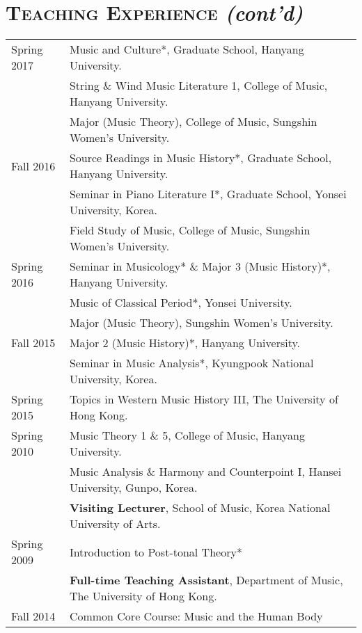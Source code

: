 \documentclass[a4paper,11pt]{article}
\begin{document}
  \section*{\textsc{Teaching Experience} \textit{(cont'd)}}
  
  \hspace*{-0.25cm}
  \begin{tabular}{p{2.5cm} l}
    Spring 2017 & Music and Culture*, Graduate School, Hanyang University.\\
    & String \& Wind Music Literature 1, College of Music, Hanyang University.\\
    & Major (Music Theory), College of Music, Sungshin Women's University.\\
    
    Fall 2016 & Source Readings in Music History*, Graduate School, Hanyang University.\\
    & Seminar in Piano Literature I*, Graduate School, Yonsei University, Korea.\\
    & Field Study of Music, College of Music, Sungshin Women's University.\\
    
    Spring 2016 & Seminar in Musicology* \& Major 3 (Music History)*, Hanyang University.\\
    & Music of Classical Period*, Yonsei University.\\
    & Major (Music Theory), Sungshin Women's University.\\
    
    Fall 2015 & Major 2 (Music History)*, Hanyang University.\\
    & Seminar in Music Analysis*, Kyungpook National University, Korea.\\
    
    Spring 2015 & Topics in Western Music History III, The University of Hong Kong.\\
    
    Spring 2010 & Music Theory 1 \& 5, College of Music, Hanyang University.\\
    & Music Analysis \& Harmony and Counterpoint I, Hansei University, Gunpo, Korea.\\[2mm]
    
	& \textbf{Visiting Lecturer}, School of Music, Korea National University of Arts.\\
	Spring 2009 & Introduction to Post-tonal Theory*\\[2mm]
	
    & \textbf{Full-time Teaching Assistant}, Department of Music, The University of Hong Kong.\\
    Fall 2014 & Common Core Course: Music and the Human Body\\[2mm]
    

\end{tabular}
\end{document}

